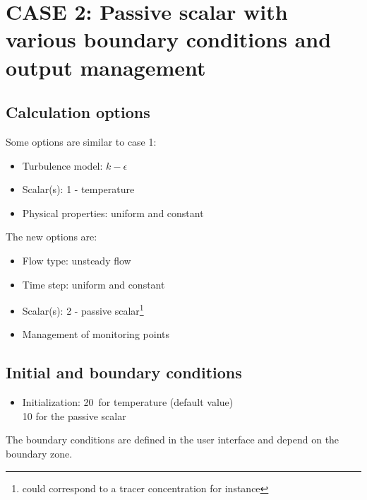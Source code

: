 \section{CASE 2: Passive scalar with various boundary conditions and output management}

	\subsection{Calculation options}

Some options are similar to case 1:
\begin{itemize}
\renewcommand{\labelitemi}{$\rightarrow$}
	\item Turbulence model: $k-\epsilon$
	\item Scalar(s): 1 - temperature
	\item Physical properties: uniform and constant
\end{itemize}

The new options are: 
\begin{itemize}
\renewcommand{\labelitemi}{$\rightarrow$}
	\item Flow type: unsteady flow
	\item Time step: uniform and constant
	\item Scalar(s): 2 - passive scalar\footnote{could correspond to a tracer
concentration for instance}
	\item Management of monitoring points
\end{itemize}


	\subsection{Initial and boundary conditions}

\begin{itemize}
\renewcommand{\labelitemi}{$\rightarrow$}
	\item Initialization: 20\degresC\ for temperature (default value) \\
	\hspace*{2.1cm}        10 for the passive scalar
\end{itemize}


The boundary conditions are defined in the user interface and depend on the
boundary zone.

